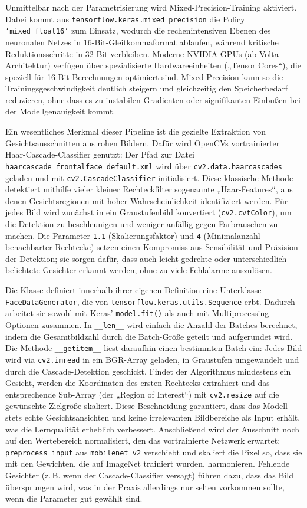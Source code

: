 Unmittelbar nach der Parametrisierung wird Mixed-Precision-Training aktiviert. Dabei kommt aus \texttt{tensorflow.keras.mixed\_precision} die Policy \texttt{'mixed\_float16'} zum Einsatz, wodurch die rechenintensiven Ebenen des neuronalen Netzes in 16-Bit-Gleitkommaformat ablaufen, während kritische Reduktionsschritte in 32 Bit verbleiben. Moderne NVIDIA-GPUs (ab Volta-Architektur) verfügen über spezialisierte Hardwareeinheiten („Tensor Cores“), die speziell für 16-Bit-Berechnungen optimiert sind. Mixed Precision kann so die Trainingsgeschwindigkeit deutlich steigern und gleichzeitig den Speicherbedarf reduzieren, ohne dass es zu instabilen Gradienten oder signifikanten Einbußen bei der Modellgenauigkeit kommt.

Ein wesentliches Merkmal dieser Pipeline ist die gezielte Extraktion von Gesichtsausschnitten aus rohen Bildern. Dafür wird OpenCVs vortrainierter Haar-Cascade-Classifier genutzt: Der Pfad zur Datei \texttt{haarcascade\_frontalface\_default.xml} wird über \texttt{cv2.data.haarcascades} geladen und mit \texttt{cv2.CascadeClassifier} initialisiert. Diese klassische Methode detektiert mithilfe vieler kleiner Rechteckfilter sogenannte „Haar-Features“, aus denen Gesichtsregionen mit hoher Wahrscheinlichkeit identifiziert werden. Für jedes Bild wird zunächst in ein Graustufenbild konvertiert (\texttt{cv2.cvtColor}), um die Detektion zu beschleunigen und weniger anfällig gegen Farbrauschen zu machen. Die Parameter \texttt{1.1} (Skalierungsfaktor) und \texttt{4} (Minimalanzahl benachbarter Rechtecke) setzen einen Kompromiss aus Sensibilität und Präzision der Detektion; sie sorgen dafür, dass auch leicht gedrehte oder unterschiedlich belichtete Gesichter erkannt werden, ohne zu viele Fehlalarme auszulösen.

Die Klasse definiert innerhalb ihrer eigenen Definition eine Unterklasse \texttt{FaceDataGenerator}, die von \texttt{tensorflow.keras.utils.Sequence} erbt. Dadurch arbeitet sie sowohl mit Keras’ \texttt{model.fit()} als auch mit Multiprocessing-Optionen zusammen. In \texttt{\_\_len\_\_} wird einfach die Anzahl der Batches berechnet, indem die Gesamtbildzahl durch die Batch-Größe geteilt und aufgerundet wird. Die Methode \texttt{\_\_getitem\_\_} liest daraufhin einen bestimmten Batch ein: Jedes Bild wird via \texttt{cv2.imread} in ein BGR-Array geladen, in Graustufen umgewandelt und durch die Cascade-Detektion geschickt. Findet der Algorithmus mindestens ein Gesicht, werden die Koordinaten des ersten Rechtecks extrahiert und das entsprechende Sub-Array (der „Region of Interest“) mit \texttt{cv2.resize} auf die gewünschte Zielgröße skaliert. Diese Beschneidung garantiert, dass das Modell stets echte Gesichtsansichten und keine irrelevanten Bildbereiche als Input erhält, was die Lernqualität erheblich verbessert. Anschließend wird der Ausschnitt noch auf den Wertebereich normalisiert, den das vortrainierte Netzwerk erwartet: \texttt{preprocess\_input} aus \texttt{mobilenet\_v2} verschiebt und skaliert die Pixel so, dass sie mit den Gewichten, die auf ImageNet trainiert wurden, harmonieren. Fehlende Gesichter (z.\,B. wenn der Cascade-Classifier versagt) führen dazu, dass das Bild übersprungen wird, was in der Praxis allerdings nur selten vorkommen sollte, wenn die Parameter gut gewählt sind.

